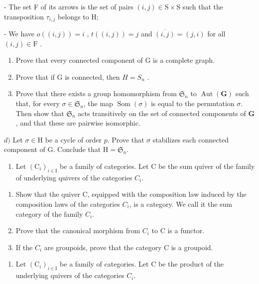 - The set F of its arrows is the set of pairs \((i,j)\in\mathrm{S}\times\mathrm{S}\) such that the transposition \(\tau_{i,j}\) belongs to H;

- We have \(o((i,j)) = i\) , \(t((i,j)) = j\) and \(\overline{(i,j)} = (j,i)\) for all \((i,j) \in \mathrm{F}\) .

\begin{enumerate}
\def\labelenumi{\alph{enumi})}
\item
  Prove that every connected component of G is a complete graph.
\item
  Prove that if G is connected, then \(H = S_{n}\) .
\item
  Prove that there exists a group homomorphism from \(\mathfrak{S}_n\) to \(\operatorname{Aut}(\mathbf{G})\) such that, for every \(\sigma \in \mathfrak{S}_n\), the map \(\operatorname{Som}(\sigma)\) is equal to the permutation \(\sigma\). Then show that \(\mathfrak{S}_n\) acts transitively on the set of connected components of \(\mathbf{G}\), and that these are pairwise isomorphic.
\end{enumerate}

\(d)\) Let \(\sigma\in\mathrm{H}\) be a cycle of order \(p\). Prove that \(\sigma\) stabilizes each connected component of G. Conclude that \(\mathrm{H}=\mathfrak{S}_{n}\).

\exercisegroup

\begin{enumerate}
\def\labelenumi{\arabic{enumi})}
\tightlist
\item
  Let \((\mathrm{C}_{i})_{i\in\mathrm{I}}\) be a family of categories. Let C be the sum quiver of the family of underlying quivers of the categories \(C_{i}\).
\end{enumerate}

\begin{enumerate}
\def\labelenumi{\alph{enumi})}
\item
  Show that the quiver C, equipped with the composition law induced by the composition laws of the categories \(C_{i}\), is a category. We call it the sum category of the family \(C_{i}\).
\item
  Prove that the canonical morphism from \(C_{i}\) to C is a functor.
\item
  If the \(C_{i}\) are groupoids, prove that the category C is a groupoid.
\end{enumerate}

\begin{enumerate}
\def\labelenumi{\arabic{enumi})}
\setcounter{enumi}{1}
\tightlist
\item
  Let \((\mathrm{C}_{i})_{i\in\mathrm{I}}\) be a family of categories. Let C be the product of the underlying quivers of the categories \(C_{i}\).
\end{enumerate}

